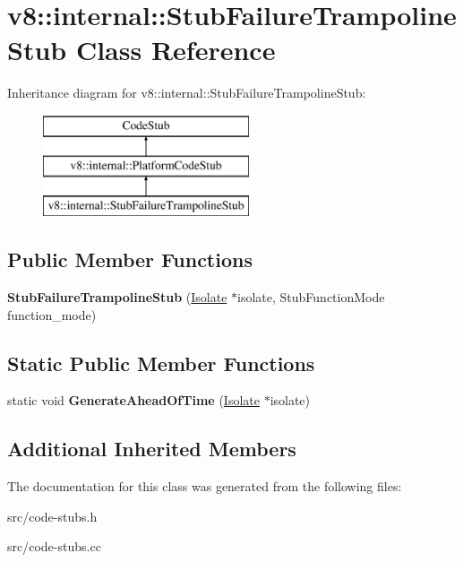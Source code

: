 \hypertarget{classv8_1_1internal_1_1_stub_failure_trampoline_stub}{}\section{v8\+:\+:internal\+:\+:Stub\+Failure\+Trampoline\+Stub Class Reference}
\label{classv8_1_1internal_1_1_stub_failure_trampoline_stub}
Inheritance diagram for v8\+:\+:internal\+:\+:Stub\+Failure\+Trampoline\+Stub\+:\begin{figure}[H]
\begin{center}
\leavevmode
\includegraphics[height=3.000000cm]{classv8_1_1internal_1_1_stub_failure_trampoline_stub}
\end{center}
\end{figure}
\subsection*{Public Member Functions}
\begin{DoxyCompactItemize}
\item 
\hypertarget{classv8_1_1internal_1_1_stub_failure_trampoline_stub_a653a40d395f1f12044dd0bf479d59911}{}{\bfseries Stub\+Failure\+Trampoline\+Stub} (\hyperlink{classv8_1_1internal_1_1_isolate}{Isolate} $\ast$isolate, Stub\+Function\+Mode function\+\_\+mode)\label{classv8_1_1internal_1_1_stub_failure_trampoline_stub_a653a40d395f1f12044dd0bf479d59911}

\end{DoxyCompactItemize}
\subsection*{Static Public Member Functions}
\begin{DoxyCompactItemize}
\item 
\hypertarget{classv8_1_1internal_1_1_stub_failure_trampoline_stub_ac64ef709e612c5dd2492247e8955bb6a}{}static void {\bfseries Generate\+Ahead\+Of\+Time} (\hyperlink{classv8_1_1internal_1_1_isolate}{Isolate} $\ast$isolate)\label{classv8_1_1internal_1_1_stub_failure_trampoline_stub_ac64ef709e612c5dd2492247e8955bb6a}

\end{DoxyCompactItemize}
\subsection*{Additional Inherited Members}


The documentation for this class was generated from the following files\+:\begin{DoxyCompactItemize}
\item 
src/code-\/stubs.\+h\item 
src/code-\/stubs.\+cc\end{DoxyCompactItemize}
